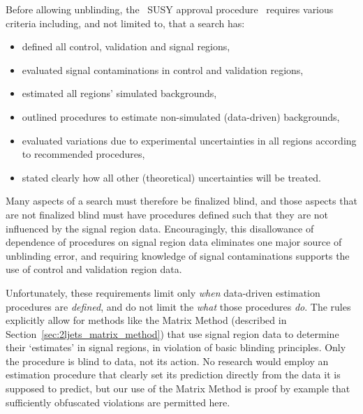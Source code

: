 Before allowing unblinding, the \atlas\ SUSY approval
procedure~\cite{atlas_twiki_susyapprove} requires various criteria including,
and not limited to, that a search has:
\begin{itemize}
\item defined all control, validation and signal regions,
\item evaluated signal contaminations in control and validation regions,
\item estimated all regions' simulated backgrounds,
\item outlined procedures to estimate non-simulated (data-driven) backgrounds,
\item evaluated variations due to experimental uncertainties in all regions
according to recommended procedures,
\item stated clearly how all other (theoretical) uncertainties will be treated.
\end{itemize}
Many aspects of a search must therefore be finalized blind, and those aspects
that are not finalized blind must have procedures defined such that they are
not influenced by the signal region data.
Encouragingly, this disallowance of dependence of procedures on signal region
data eliminates one major source of unblinding error,
and requiring knowledge of signal contaminations supports the use of control
and validation region data.

Unfortunately, these requirements limit only \emph{when} data-driven estimation
procedures are \emph{defined},
and do not limit the \emph{what} those procedures \emph{do}.
The rules explicitly allow for methods like the Matrix Method
(described in Section~\ref{sec:2ljets_matrix_method})
that use signal region data to determine their `estimates' in signal
regions, in violation of basic blinding principles.
Only the procedure is blind to data, not its action.
No research would employ an estimation procedure that clearly set its
prediction directly from the data it is supposed to predict, but our use of the
Matrix Method is proof by example that sufficiently obfuscated violations are
permitted here.

